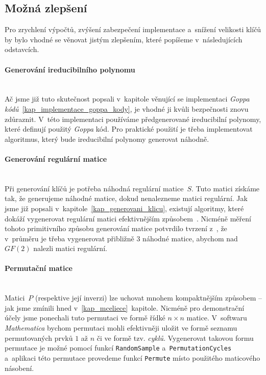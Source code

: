\documentclass[thesis=M,czech,hidelinks]{FITthesis}[2012/06/26]
\newcommand{\0}{{\textcolor[gray]{0.75}{0}}}
\begin{document}
\subsection{Možná zlepšení}\label{kap_mceliece_zlepseni}

Pro zrychlení výpočtů, zvýšení zabezpečení implementace a~snížení velikosti
klíčů by bylo vhodné se věnovat jistým zlepšením, které popíšeme v~následujících
odstavcích.


\paragraph{Generování ireducibilního polynomu} \hfil \\
Ač jsme již tuto skutečnost popsali v~kapitole věnující se implementaci
\emph{Goppa kódů}~\ref{kap_implementace_goppa_kody}, je vhodné ji kvůli
bezpečnosti znovu zdůraznit. V~této implementaci používáme předgenerované
ireducibilní polynomy, které definují použitý \emph{Goppa} kód. Pro praktické
použití je třeba implementovat algoritmus, který bude ireducibilní polynomy
generovat náhodně.


\paragraph{Generování regulární matice} \hfil \\
Při generování klíčů je potřeba náhodná regulární matice~$S$. Tuto matici
získáme tak, že generujeme náhodné matice, dokud nenalezneme matici regulární.
Jak jsme již popsali v~kapitole~\ref{kap_generovani_klicu}, existují algoritmy,
které dokáží vygenerovat regulární matici efektivnějším způsobem~\cite{Randall}.
Nicméně měření tohoto primitivního způsobu generování matice potvrdilo tvrzení
z~\cite{Heyse}, že v~průměru je třeba vygenerovat přibližně 3 náhodné matice,
abychom nad $GF(2)$ nalezli matici regulární.


\paragraph{Permutační matice} \hfil \\
Matici~$P$ (respektive její inverzi) lze uchovat mnohem kompaktnějším způsobem
-- jak jsme zmínili hned v~\ref{kap_mceliece}~kapitole. Nicméně pro demonstrační
účely jsme ponechali tuto permutaci ve formě řídké $n \times n$ matice.
V~softwaru \emph{Mathematica} bychom permutaci mohli efektivněji uložit ve formě
seznamu permutovaných prvků $1$ až $n$ či ve formě tzv. \emph{cyklů}.
Vygenerovat takovou formu permutace je možné pomocí funkcí \texttt{RandomSample}
a~\texttt{PermutationCycles} a~aplikaci této permutace provedeme funkcí
\texttt{Permute} místo použitého maticového násobení.
\end{document}
